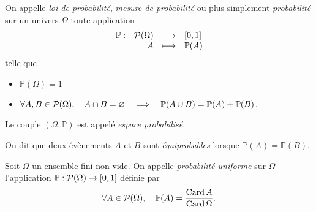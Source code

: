 \documentclass{magnolia}
\begin{document}

\begin{definition}
On appelle \emph{loi de probabilité}, \emph{mesure de probabilité} ou plus simplement \emph{probabilité} sur un univers $\Omega$
toute application
\[\begin{array}[t]{lrcl} \displaystyle{\mathbb{P}} : & \displaystyle{\mathcal{P}(\Omega)} & \longrightarrow & \displaystyle{\left[0,1\right]} \\ & \displaystyle{A} & \longmapsto & \displaystyle{\mathbb{P}(A)} \end{array}\]
telle que
\begin{itemize}
\item $\mathbb{P}(\Omega)=1$
\item $\forall A,B\in\mathcal{P}(\Omega),\quad A\cap B=\varnothing \quad\Longrightarrow\quad
  \mathbb{P}(A\cup B)=\mathbb{P}(A)+\mathbb{P}(B)$.
\end{itemize}
Le couple $(\Omega,\mathbb{P})$ est appelé \emph{espace probabilisé}.
\end{definition}

\begin{remarqueUnique}
\remarque On dit que deux évènements $A$ et $B$ sont \emph{équiprobables}
  lorsque $\mathbb{P}(A)=\mathbb{P}(B)$.
\end{remarqueUnique}

\begin{definition}
  Soit $\Omega$ un ensemble fini non vide. On appelle \emph{probabilité uniforme} sur $\Omega$
  l'application $\mathbb{P}:\mathcal{P}(\Omega)\to\left[0,1\right]$ définie par
  \[\forall A\in\mathcal{P}(\Omega),\quad \mathbb{P}(A)=\frac{\operatorname{Card} A}{\operatorname{Card} \Omega}.\] 
  \end{definition}
  
\end{document}
